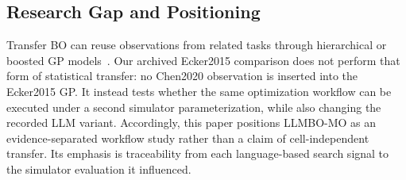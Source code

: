 \subsection{Research Gap and Positioning}

Transfer BO can reuse observations from related tasks through hierarchical or
boosted GP models~\cite{ref29}. Our archived Ecker2015 comparison does not
perform that form of statistical transfer: no Chen2020 observation is inserted
into the Ecker2015 GP. It instead tests whether the same optimization workflow
can be executed under a second simulator parameterization, while also changing
the recorded LLM variant. Accordingly, this paper positions LLMBO-MO as an
evidence-separated workflow study rather than a claim of cell-independent
transfer. Its emphasis is traceability from each language-based search signal
to the simulator evaluation it influenced.
